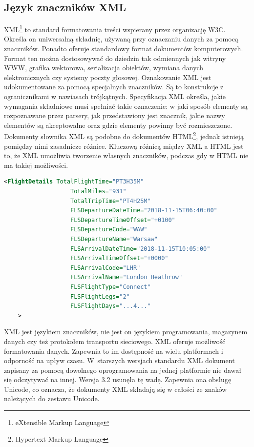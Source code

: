 \documentclass[12pt, twoside]{report}
\begin{document}
\subsection{Język znaczników XML}
XML\footnote{eXtensible Markup Language} to standard formatowania treści wspierany przez organizację W3C. Określa on uniwersalną składnię, używaną przy oznaczaniu danych za pomocą znaczników. Ponadto oferuje standardowy format dokumentów komputerowych. Format ten można dostosowywać do dziedzin tak odmiennych jak witryny WWW, grafika wektorowa, serializacja obiektów, wymiana danych elektronicznych czy systemy poczty głosowej. Oznakowanie XML jest udokumentowane za pomocą specjalnych znaczników. Są to konstrukcje z ogranicznikami w nawiasach trójkątnych. Specyfikacja XML określa, jakie wymagania składniowe musi spełniać takie oznaczenie: w jaki sposób elementy są rozpoznawane przez parsery, jak przedstawiony jest znacznik, jakie nazwy elementów są akceptowalne oraz gdzie elementy powinny być rozmieszczone. Dokumenty słownika XML są podobne do dokumentów HTML\footnote{Hypertext Markup Language}, jednak istnieją pomiędzy nimi zasadnicze różnice. Kluczową różnicą między XML a HTML jest to, że XML umożliwia tworzenie własnych znaczników, podczas gdy w HTML nie ma takiej możliwości\cite{xml}.

\begin{lstlisting}[language=XML, caption=Fragment danych w formacie XML, label=list::xml]
    <FlightDetails TotalFlightTime="PT3H35M"
                   TotalMiles="931"
                   TotalTripTime="PT4H25M"
                   FLSDepartureDateTime="2018-11-15T06:40:00"
                   FLSDepartureTimeOffset="+0100"
                   FLSDepartureCode="WAW"
                   FLSDepartureName="Warsaw"
                   FLSArrivalDateTime="2018-11-15T10:05:00"
                   FLSArrivalTimeOffset="+0000"
                   FLSArrivalCode="LHR"
                   FLSArrivalName="London Heathrow"
                   FLSFlightType="Connect"
                   FLSFlightLegs="2"
                   FLSFlightDays="...4..."
    >
\end{lstlisting}

XML jest językiem znaczników, nie jest on językiem programowania, magazynem danych czy też protokołem transportu sieciowego. XML oferuje możliwość formatowania danych. Zapewnia to im dostępność na wielu platformach i odporność na upływ czasu. W~starszych wersjach standardu XML dokument zapisany za pomocą dowolnego oprogramowania na jednej platformie nie dawał się odczytywać na innej. Wersja 3.2 usunęła tę wadę. Zapewnia ona obsługę Unicode, co oznacza, że dokumenty XML składają się w całości ze znaków należących do zestawu Unicode. 
\end{document}
